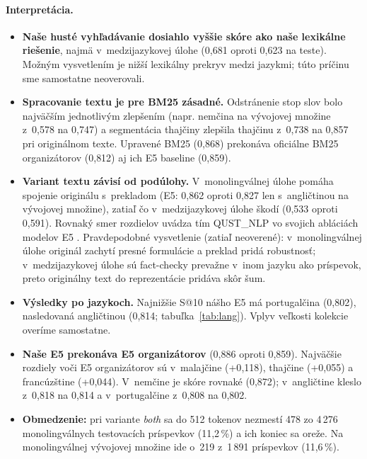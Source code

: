 \documentclass[11pt,a4paper]{article}
\makeatletter
\newcommand{\sat}{S@10}
\makeatother
\begin{document}






\paragraph{Interpretácia.}
\begin{itemize}
  \item \textbf{Naše husté vyhľadávanie dosiahlo vyššie skóre ako naše lexikálne riešenie}, najmä v~medzijazykovej úlohe (0{,}681 oproti 0{,}623 na teste).
  Možným vysvetlením je nižší lexikálny prekryv medzi jazykmi; túto príčinu sme samostatne neoverovali.
  \item \textbf{Spracovanie textu je pre BM25 zásadné.}
  Odstránenie stop slov bolo najväčším jednotlivým zlepšením (napr. nemčina na vývojovej množine z~0{,}578 na 0{,}747) a segmentácia thajčiny zlepšila thajčinu z~0{,}738 na 0{,}857 pri originálnom texte.
  Upravené BM25 (0{,}868) prekonáva oficiálne BM25 organizátorov (0{,}812) aj ich E5 baseline (0{,}859).
  \item \textbf{Variant textu závisí od podúlohy.}
  V~monolingválnej úlohe pomáha spojenie originálu s~prekladom (E5: 0{,}862 oproti 0{,}827 len s~angličtinou na vývojovej množine), zatiaľ čo v~medzijazykovej úlohe škodí (0{,}533 oproti 0{,}591).
  Rovnaký smer rozdielov uvádza tím QUST\_NLP vo svojich abláciách modelov E5 \citep{liu-etal-2025-qust}.
  Pravdepodobné vysvetlenie (zatiaľ neoverené): v~monolingválnej úlohe originál zachytí presné formulácie a preklad pridá robustnosť; v~medzijazykovej úlohe sú fact-checky prevažne v~inom jazyku ako príspevok, preto originálny text do reprezentácie pridáva skôr šum.
  \item \textbf{Výsledky po jazykoch.}
  Najnižšie \sat{} nášho E5 má portugalčina (0{,}802), nasledovaná angličtinou (0{,}814; tabuľka~\ref{tab:lang}).
  Vplyv veľkosti kolekcie overíme samostatne.
  \item \textbf{Naše E5 prekonáva E5 organizátorov} (0{,}886 oproti 0{,}859).
  Najväčšie rozdiely voči E5 organizátorov sú v~malajčine (+0{,}118), thajčine (+0{,}055) a francúzštine (+0{,}044).
  V~nemčine je skóre rovnaké (0{,}872); v~angličtine kleslo z~0{,}818 na 0{,}814 a v~portugalčine z~0{,}808 na 0{,}802.
  \item \textbf{Obmedzenie:} pri variante \emph{both} sa do 512 tokenov nezmestí 478 zo 4\,276 monolingválnych testovacích príspevkov (11{,}2\,\%) a ich koniec sa oreže.
  Na monolingválnej vývojovej množine ide o~219 z~1\,891 príspevkov (11{,}6\,\%).
\end{itemize}
\end{document}
